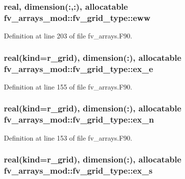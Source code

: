 \subsubsection[{eww}]{\setlength{\rightskip}{0pt plus 5cm}real, dimension(\-:,\-:), allocatable fv\-\_\-arrays\-\_\-mod\-::fv\-\_\-grid\-\_\-type\-::eww}\label{structfv__arrays__mod_1_1fv__grid__type_a0f16d115d609b95b647e85c869f44cb4}


Definition at line 203 of file fv\-\_\-arrays.\-F90.

\subsubsection[{ex\-\_\-e}]{\setlength{\rightskip}{0pt plus 5cm}real(kind={\bf r\-\_\-grid}), dimension(\-:), allocatable fv\-\_\-arrays\-\_\-mod\-::fv\-\_\-grid\-\_\-type\-::ex\-\_\-e}\label{structfv__arrays__mod_1_1fv__grid__type_a345df2e66abf34e78c67bf5f0fd637ed}


Definition at line 155 of file fv\-\_\-arrays.\-F90.

\subsubsection[{ex\-\_\-n}]{\setlength{\rightskip}{0pt plus 5cm}real(kind={\bf r\-\_\-grid}), dimension(\-:), allocatable fv\-\_\-arrays\-\_\-mod\-::fv\-\_\-grid\-\_\-type\-::ex\-\_\-n}\label{structfv__arrays__mod_1_1fv__grid__type_a663a182c460c4b7efcebf76b5c925fcc}


Definition at line 153 of file fv\-\_\-arrays.\-F90.

\subsubsection[{ex\-\_\-s}]{\setlength{\rightskip}{0pt plus 5cm}real(kind={\bf r\-\_\-grid}), dimension(\-:), allocatable fv\-\_\-arrays\-\_\-mod\-::fv\-\_\-grid\-\_\-type\-::ex\-\_\-s}\label{structfv__arrays__mod_1_1fv__grid__type_a6b7012fcbcb22a5cc14c9be2485a3c41}



